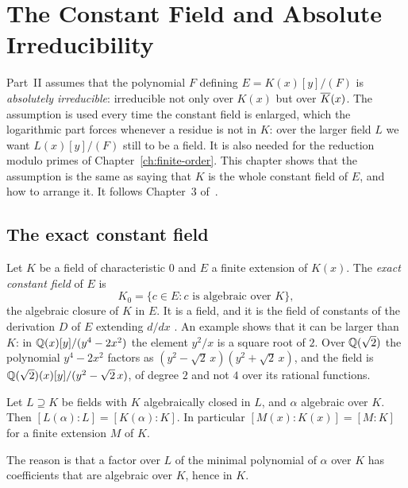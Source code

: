 \chapter[The Constant Field]{The Constant Field and Absolute Irreducibility}\label{ch:constant-field}

Part~II assumes that the polynomial $F$ defining $E = K(x)[y]/(F)$ is
\emph{absolutely irreducible}: irreducible not only over $K(x)$ but over
$\overline{K}(x)$. The assumption is used every time the constant field is enlarged,
which the logarithmic part forces whenever a residue is not in $K$: over the
larger field $L$ we want $L(x)[y]/(F)$ still to be a field. It is also needed
for the reduction modulo primes of Chapter~\ref{ch:finite-order}. This chapter
shows that the assumption is the same as saying that $K$ is the whole
constant field of $E$, and how to arrange it. It follows Chapter~3
of~\cite{trager1984}.

\section{The exact constant field}\label{sec:const-exact}

Let $K$ be a field of characteristic $0$ and $E$ a finite extension of
$K(x)$. The \emph{exact constant field} of $E$ is
\[
  K_0 = \{ c \in E : c \text{ is algebraic over } K \} ,
\]
the algebraic closure of $K$ in $E$. It is a field, and it is the field of
constants of the derivation $D$ of $E$ extending $d/dx$
. An example shows that it can be larger than $K$: in
$\mathbb{Q}(x)[y]/(y^4 - 2x^2)$ the element $y^2/x$ is a square root of $2$. Over
$\mathbb{Q}(\sqrt2)$ the polynomial $y^4 - 2x^2$ factors as $(y^2 - \sqrt2\, x)(y^2 +
\sqrt2\, x)$, and the field is $\mathbb{Q}(\sqrt2)(x)[y]/(y^2 - \sqrt2\, x)$, of degree
$2$ and not $4$ over its rational functions.

\begin{lemma}\label{lem:const-degree}
Let $L \supseteq K$ be fields with $K$ algebraically closed in $L$, and
$\alpha$ algebraic over $K$. Then $[L(\alpha) : L] = [K(\alpha) : K]$. In
particular $[M(x) : K(x)] = [M : K]$ for a finite extension $M$ of $K$.
\end{lemma}

The reason is that a factor over $L$ of the minimal polynomial of $\alpha$
over $K$ has coefficients that are algebraic over $K$, hence in $K$.

